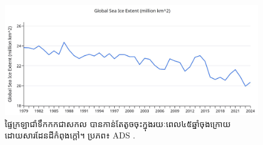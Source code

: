 \documentclass[10pt,twocolumn,letterpaper]{article}
\begin{document}
\begin{figure}[t]
\begin{center}
\includegraphics[width=1\textwidth]{ice.jpg}
\end{center}
   \caption{ផ្ទៃក្រឡាជាំទឹកកកជាសកល បានកាន់តែតូចចុះក្នុងរយៈពេល៤៥ឆ្នាំចុងក្រោយ ដោយសារដែនដីកំពុងក្ដៅ។ ប្រភព៖ ADS \cite{149}.}
\label{fig:24}
\end{figure}

\clearpage
\twocolumn

{\small
\renewcommand{\refname}{ឯកសារយោង}


}
\end{document}
